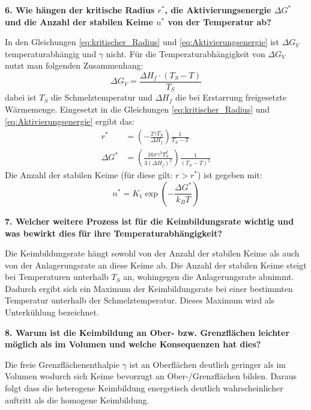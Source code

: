 \noindent\textbf{6. Wie hängen der kritische Radius $r^*$, die Aktivierungsenergie $\Delta G^*$ 
und die Anzahl der stabilen Keime $n^*$ von der Temperatur ab?
}\\
\begin{addmargin}[25pt]{0pt}
In den Gleichungen \ref{eq:kritischer_Radius} und \ref{eq:Aktivierungsenergie} ist $\Delta G_V$ temperaturabhängig und $\gamma$ nicht. Für die Temperaturabhängigkeit von $\Delta G_V$ nutzt man folgenden Zusammenhang:
\begin{equation}\label{eq:Umwandlungswärme}
    \Delta G_V = \frac{\Delta H_f \cdot (T_S - T)}{T_S}
\end{equation}
dabei ist $T_S$ die Schmelztemperatur und $\Delta H_f$ die bei Erstarrung freigesetzte Wärmemenge. Eingesetzt in die Gleichungen  \ref{eq:kritischer_Radius} und \ref{eq:Aktivierungsenergie} ergibt das:
\begin{align}
    r^* &= \left( - \frac{2\gamma T_S}{\Delta H_f}\right) \frac{1}{T_S - T}\\
    \Delta G^* &= \left( \frac{16\pi \gamma^3 T_S^2}{3(\Delta H_f)^2}\right) \frac{1}{(T_S - T)^2} 
\end{align}
Die Anzahl der stabilen Keime (für diese gilt: $r>r^*$) ist gegeben mit:
\begin{equation}
    n^* = K_1 \exp(-\frac{\Delta G^*}{k_BT})
\end{equation}
\end{addmargin}

\noindent\textbf{7. Welcher weitere Prozess ist für die Keimbildungsrate wichtig und was bewirkt dies für ihre Temperaturabhängigkeit?}\\
\begin{addmargin}[25pt]{0pt}
Die Keimbildungsrate hängt sowohl von der Anzahl der stabilen Keime als auch von der Anlagerungsrate an diese Keime ab. Die Anzahl der stabilen Keime steigt bei Temperaturen unterhalb $T_S$ an, wohingegen die Anlagerungsrate abnimmt. Dadurch ergibt sich ein Maximum der Keimbildungsrate bei einer bestimmten Temperatur unterhalb der Schmelztemperatur. Dieses Maximum wird als Unterkühlung bezeichnet.\\
\end{addmargin}

\noindent\textbf{8. Warum ist die Keimbildung an Ober- bzw. Grenzflächen leichter möglich als im Volumen und welche Konsequenzen hat dies?}\\
\begin{addmargin}[25pt]{0pt}
Die freie Grenzflächenenthalpie $\gamma$ ist an Oberflächen deutlich geringer als im Volumen wodurch sich Keime bevorzugt an Ober-/Grenzflächen bilden. Daraus folgt dass die heterogene Keimbildung energetisch deutlich wahrscheinlicher auftritt als die homogene Keimbildung.\\
\end{addmargin}

